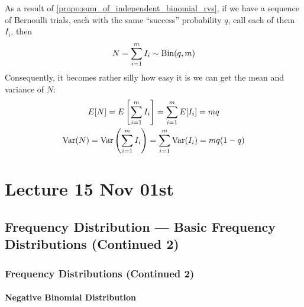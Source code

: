 \documentclass[notoc,notitlepage]{tufte-book}
\begin{document}
\begin{note}
  As a result of \cref{propo:sum_of_independent_binomial_rvs}, if we have a sequence of Bernoulli trials, each with the same ``success'' probability $q$, call each of them $I_i$, then
  \begin{equation*}
    N = \sum_{i=1}^{m} I_i \sim \operatorname{Bin} ( q, m )
  \end{equation*}
  Consequently, it becomes rather silly how easy it is we can get the mean and variance of $N$:
  \begin{gather*}
    E[N] = E \left[ \sum_{i=1}^{m} I_i \right] = \sum_{i=1}^{m} E [ I_i ] = mq \\
    \operatorname{Var}(N) = \operatorname{Var} \left( \sum_{i=1}^{m} I_i \right) = \sum_{i=1}^{m} \operatorname{Var}(I_i) = mq(1 - q)
  \end{gather*}
\end{note}





\chapter{Lecture 15 Nov 01st}%
\label{chp:lecture_15_nov_01st}

\section{Frequency Distribution --- Basic Frequency Distributions (Continued 2)}%
\label{sec:frequency_distribution_basic_frequency_distributions_continued_2}

\subsection{Frequency Distributions (Continued 2)}%
\label{sub:frequency_distributions_continued_2}

\subsubsection{Negative Binomial Distribution}%
\label{ssub:negative_binomial_distribution}
\end{document}
